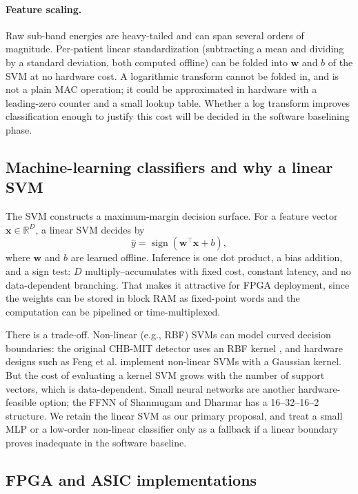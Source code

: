 \documentclass[10pt,twocolumn,letterpaper]{article}
\begin{document}
\paragraph{Feature scaling.} Raw sub-band energies are heavy-tailed and
can span several orders of magnitude. Per-patient linear standardization
(subtracting a mean and dividing by a standard deviation, both computed
offline) can be folded into $\mathbf{w}$ and $b$ of the SVM at no
hardware cost. A logarithmic transform cannot be folded in, and is not a
plain MAC operation; it could be approximated in hardware with a
leading-zero counter and a small lookup table. Whether a log transform
improves classification enough to justify this cost will be decided in
the software baselining phase.

\subsection{Machine-learning classifiers and why a linear SVM}

The SVM \cite{cortes1995support} constructs a maximum-margin decision
surface. For a feature vector $\mathbf{x}\in\mathbb{R}^{D}$, a linear SVM
decides by
\begin{equation}
  \hat{y}=\operatorname{sign}\!\left(\mathbf{w}^{\top}\mathbf{x}+b\right),
\end{equation}
where $\mathbf{w}$ and $b$ are learned offline. Inference is one dot
product, a bias addition, and a sign test: $D$ multiply--accumulates
with fixed cost, constant latency, and no data-dependent branching. That
makes it attractive for FPGA deployment, since the weights can be stored
in block RAM as fixed-point words and the computation can be pipelined
or time-multiplexed.

There is a trade-off. Non-linear (e.g., RBF) SVMs can model curved
decision boundaries: the original CHB-MIT detector uses an RBF kernel
\cite{shoeb2010icml}, and hardware designs such as Feng et al.
\cite{feng2018vlsi} implement non-linear SVMs with a Gaussian kernel.
But the cost of evaluating a kernel SVM grows with the number of support
vectors, which is data-dependent. Small neural networks are another
hardware-feasible option; the FFNN of Shanmugam and Dharmar
\cite{shanmugam2025ffnn} has a 16--32--16--2 structure. We retain the
linear SVM as our primary proposal, and treat a small MLP or a low-order
non-linear classifier only as a fallback if a linear boundary proves
inadequate in the software baseline.

\subsection{FPGA and ASIC implementations}
\label{sec:hw}
\end{document}
